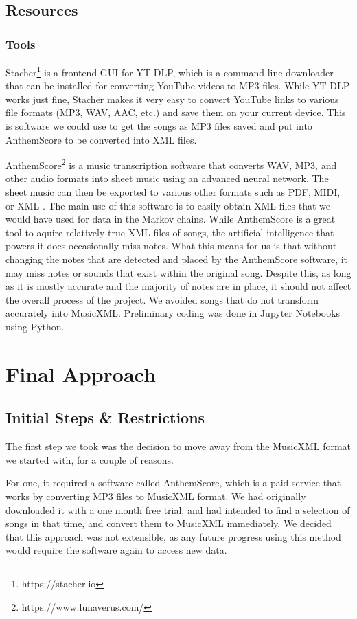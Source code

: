 \documentclass{article}
\begin{document}
\subsection{Resources}
\subsubsection{Tools}
Stacher\footnote{https://stacher.io} is a frontend GUI for YT-DLP, which is a command line downloader that can be installed for converting YouTube videos to MP3 files.
While YT-DLP works just fine, Stacher makes it very easy to convert YouTube links to various file formats (MP3, WAV, AAC, etc.) and save them on your current device. This 
is software we could use to get the songs as MP3 files saved and put into AnthemScore to be converted into XML files.

AnthemScore\footnote{https://www.lunaverus.com/} is a music transcription software that converts WAV, MP3, and other audio formats into sheet music using an advanced 
neural network. The sheet music can then be exported to various other formats such as PDF, MIDI, or XML \cite{anthemscore}. The main use of this software is to easily obtain 
XML files that we would have used for data in the Markov chains. While AnthemScore is a great tool to aquire relatively true XML files of songs, the artificial intelligence 
that powers it does occasionally miss notes. What this means for us is that without changing the notes that are detected and placed by the AnthemScore software, it may miss 
notes or sounds that exist within the original song. Despite this, as long as it is mostly accurate and the majority of notes are in place, it should not affect the overall 
process of the project. We avoided songs that do not transform accurately into MusicXML. Preliminary coding was done in Jupyter Notebooks using Python. 


\section{Final Approach}
\subsection{Initial Steps \& Restrictions}
The first step we took was the decision to move away from the MusicXML format we started with, for a couple of reasons. 

For one, it required a software called AnthemScore, which is a paid service that works by converting MP3 files to MusicXML format. We had originally downloaded it with a 
one month free trial, and had intended to find a selection of songs in that time, and convert them to MusicXML immediately. We decided that this approach was not extensible, 
as any future progress using this method would require the software again to access new data. 
\end{document}
